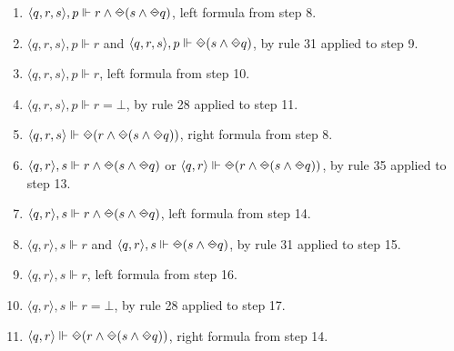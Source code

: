 \begin{myEx}
\begin{enumerate}
\item $\langle q, r, s \rangle, p \Vdash r \land \LTLonce(s \land \LTLonce q)$, left formula from step 8.\\ %

\item $\langle q, r, s \rangle, p \Vdash r$ and $\langle q, r, s \rangle, p \Vdash \LTLonce(s \land \LTLonce q)$, by rule 31 applied to step 9.\\ %

\item $\langle q, r, s \rangle, p \Vdash r$, left formula from step 10.\\ %

\item $\langle q, r, s \rangle, p \Vdash r = \bot$, by rule 28 applied to step 11.\\ %

\item $\langle q, r, s \rangle \Vdash \LTLonce(r \land \LTLonce(s \land \LTLonce q))$, right formula from step 8.\\ %

\item $\langle q, r \rangle, s \Vdash r \land \LTLonce(s \land \LTLonce q)$ or $\langle q, r \rangle \Vdash \LTLonce(r \land \LTLonce(s \land \LTLonce q))$, by rule 35 applied to step 13.\\ %

\item $\langle q, r \rangle, s \Vdash r \land \LTLonce(s \land \LTLonce q)$, left formula from step 14.\\ %

\item $\langle q, r \rangle, s \Vdash r$ and $\langle q, r \rangle, s \Vdash \LTLonce(s \land \LTLonce q)$, by rule 31 applied to step 15.\\ %

\item $\langle q, r \rangle, s \Vdash r$, left formula from step 16.\\ %

\item $\langle q, r \rangle, s \Vdash r = \bot$, by rule 28 applied to step 17.\\ %

\item $\langle q, r \rangle \Vdash \LTLonce(r \land \LTLonce(s \land \LTLonce q))$, right formula from step 14.\\ %


\end{enumerate}
\end{myEx}
